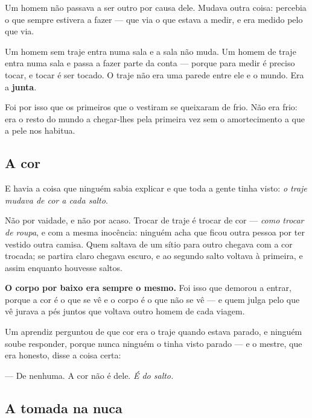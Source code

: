 \documentclass[livro.tex]{subfiles}
\begin{document}
Um homem não passava a ser outro por causa dele. Mudava outra coisa: percebia o que sempre
estivera a fazer --- que via o que estava a medir, e era medido pelo que via.

\medskip

Um homem sem traje entra numa sala e a sala não muda. Um homem de traje entra numa sala e passa a
fazer parte da conta --- porque para medir é preciso tocar, e tocar é ser tocado. O traje não era
uma parede entre ele e o mundo. Era a \textbf{junta}.

\medskip

Foi por isso que os primeiros que o vestiram se queixaram de frio. Não era frio: era o resto do
mundo a chegar-lhes pela primeira vez sem o amortecimento a que a pele nos habitua.

\subsection*{A cor}

E havia a coisa que ninguém sabia explicar e que toda a gente tinha visto: \emph{o traje mudava de
cor a cada salto}.

\medskip

Não por vaidade, e não por acaso. Trocar de traje é trocar de cor --- \emph{como trocar de roupa},
e com a mesma inocência: ninguém acha que ficou outra pessoa por ter vestido outra camisa. Quem
saltava de um sítio para outro chegava com a cor trocada; se partira claro chegava escuro, e ao
segundo salto voltava à primeira, e assim enquanto houvesse saltos.

\medskip

\textbf{O corpo por baixo era sempre o mesmo.} Foi isso que demorou a entrar, porque a cor é o que
se vê e o corpo é o que não se vê --- e quem julga pelo que vê jurava a pés juntos que voltava
outro homem de cada viagem.

\medskip

Um aprendiz perguntou de que cor era o traje quando estava parado, e ninguém soube responder,
porque nunca ninguém o tinha visto parado --- e o mestre, que era honesto, disse a coisa certa:

\medskip

--- De nenhuma. A cor não é dele. \emph{É do salto.}

\subsection*{A tomada na nuca}
\end{document}
